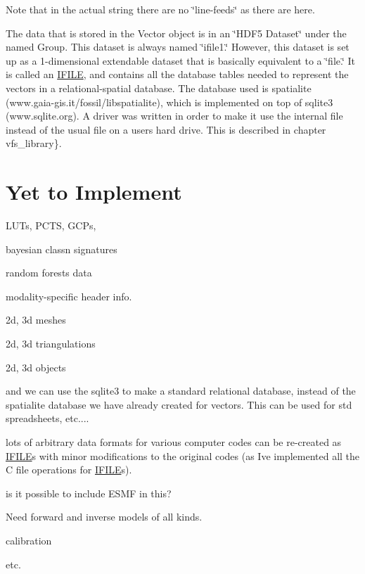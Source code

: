 Note that in the actual string there are no \char`\"{}line-\/feeds\char`\"{} as there are here.

The data that is stored in the Vector object is in an \char`\"{}\+H\+D\+F5 Dataset\char`\"{} under the named Group. This dataset is always named \char`\"{}ifile1.\char`\"{} However, this dataset is set up as a 1-\/dimensional extendable dataset that is basically equivalent to a \char`\"{}file.\char`\"{} It is called an \hyperlink{structIFILE}{I\+F\+I\+L\+E}, and contains all the database tables needed to represent the vectors in a relational-\/spatial database. The database used is spatialite (www.\+gaia-\/gis.\+it/fossil/libspatialite), which is implemented on top of sqlite3 (www.\+sqlite.\+org). A driver was written in order to make it use the internal file instead of the usual file on a user\textquotesingle{}s hard drive. This is described in chapter vfs\+\_\+library\}.\hypertarget{file_format_file_format_yet}{}\section{Yet to Implement}\label{file_format_file_format_yet}

L\+U\+Ts, P\+C\+T\+S, G\+C\+Ps,

bayesian classn signatures

random forests data

modality-\/specific header info.

2d, 3d meshes

2d, 3d triangulations

2d, 3d objects

and we can use the sqlite3 to make a standard relational database, instead of the spatialite database we have already created for vectors. This can be used for std spreadsheets, etc....

lots of arbitrary data formats for various computer codes can be re-\/created as \hyperlink{structIFILE}{I\+F\+I\+L\+E}\textquotesingle{}s with minor modifications to the original codes (as I\textquotesingle{}ve implemented all the C file operations for \hyperlink{structIFILE}{I\+F\+I\+L\+E}\textquotesingle{}s).

is it possible to include E\+S\+M\+F in this?

Need forward and inverse models of all kinds.

calibration

etc. 